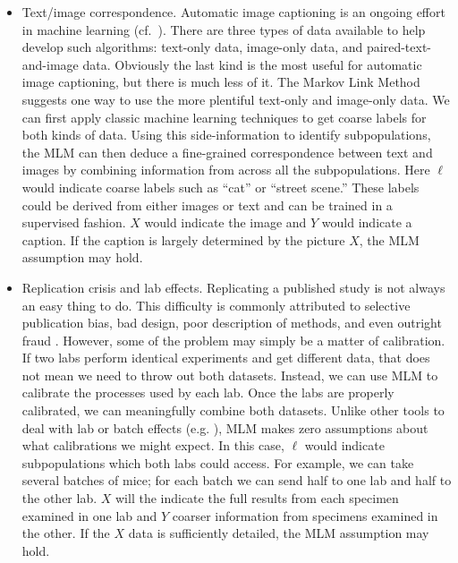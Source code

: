 \begin{itemize}
    \item Text/image correspondence.  Automatic image captioning is an ongoing effort in machine learning (cf.\ \cite{srivastava2018survey}).  There are three types of data available to help develop such algorithms: text-only data, image-only data, and paired-text-and-image data.  Obviously the last kind is the most useful for automatic image captioning, but there is much less of it.  The Markov Link Method suggests one way to use the more plentiful text-only and image-only data.  We can first apply classic machine learning techniques to get coarse labels for both kinds of data.  Using this side-information to identify subpopulations, the MLM can then deduce a fine-grained correspondence between text and images by combining information from across all the subpopulations.  Here $\ell$ would indicate coarse labels such as ``cat'' or ``street scene.''  These labels could be derived from either images or text and can be trained in a supervised fashion.  $X$ would indicate the image and $Y$ would indicate a caption.  If the caption is largely determined by the picture $X$, the MLM assumption may hold.  

    \item Replication crisis and lab effects.  Replicating a published study is not always an easy thing to do.  This difficulty is commonly attributed to selective publication bias, bad design, poor description of methods, and even outright fraud \cite{baker2016reproducibility}.  However, some of the problem may simply be a matter of calibration.  If two labs perform identical experiments and get different data, that does not mean we need to throw out both datasets.  Instead, we can use MLM to calibrate the processes used by each lab.  Once the labs are properly calibrated, we can meaningfully combine both datasets.  Unlike other tools to deal with lab or batch effects (e.g. \cite{crow2018characterizing,johnson2007adjusting}), MLM makes zero assumptions about what calibrations we might expect.  In this case, $\ell$ would indicate subpopulations which both labs could access.  For example, we can take several batches of mice; for each batch we can send half to one lab and half to the other lab.  $X$ will the indicate the full results from each specimen examined in one lab and $Y$ coarser information from specimens examined in the other.  If the $X$ data is sufficiently detailed, the MLM assumption may hold.  
\end{itemize}

%                                                    

